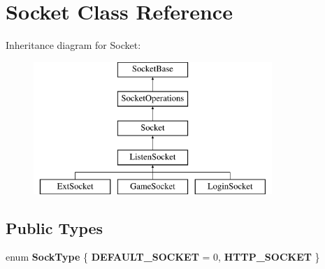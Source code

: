\hypertarget{classSocket}{\section{\-Socket \-Class \-Reference}
\label{classSocket}
}
\-Inheritance diagram for \-Socket\-:\begin{figure}[H]
\begin{center}
\leavevmode
\includegraphics[height=5.000000cm]{classSocket}
\end{center}
\end{figure}
\subsection*{\-Public \-Types}
\begin{DoxyCompactItemize}
\item 
enum {\bfseries \-Sock\-Type} \{ {\bfseries \-D\-E\-F\-A\-U\-L\-T\-\_\-\-S\-O\-C\-K\-E\-T} =  0, 
{\bfseries \-H\-T\-T\-P\-\_\-\-S\-O\-C\-K\-E\-T}
 \}
\end{DoxyCompactItemize}
